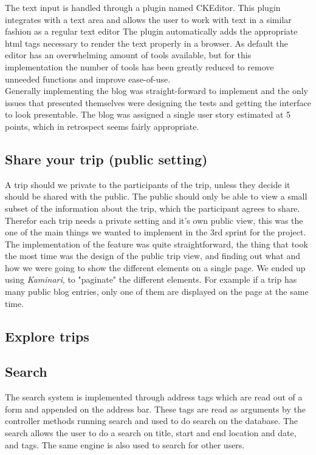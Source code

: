\documentclass[a4paper]{article}
\begin{document}
\noindent
The text input is handled through a plugin named CKEditor\cite{CKEditor}. This plugin integrates with a text area and allows the user to work with text in a similar fashion as a regular text editor The plugin automatically adds the appropriate html tags necessary to render the text properly in a browser. As default the editor has an overwhelming amount of tools available, but for this implementation the number of tools has been greatly reduced to remove unneeded functions and improve ease-of-use.\\

\noindent
Generally implementing the blog was straight-forward to implement and the only issues that presented themselves were designing the tests and getting the interface to look presentable. The blog was assigned a single user story estimated at 5 points, which in retrospect seems fairly appropriate.

\subsection{Share your trip (public setting)}
A trip should we private to the participants of the trip, unless they decide it should be shared with the public. The public should only be able to view a small subset of the information about the trip, which the participant agrees to share.  Therefor each trip needs a private setting and it's own public view, this was the one of the main things we wanted to implement in the 3rd sprint for the project. \\

\noindent
The implementation of the feature was quite straightforward, the thing that took the most time was the design of the public trip view, and finding out what and how we were going to show the different elements on a single page. We ended up using \emph{Kaminari}\cite{kaminari}, to "paginate" the different elements. For example if a trip has many public blog entries, only one of them are displayed on the page at the same time. 

\subsection{Explore trips}

\subsection{Search}
The search system is implemented through address tags which are read out of a form and appended on the address bar. These tags are read as arguments by the controller methods running search and used to do search on the database. The search allows the user to do a search on title, start and end location and date, and tags. The same engine is also used to search for other users.\\
\end{document}
